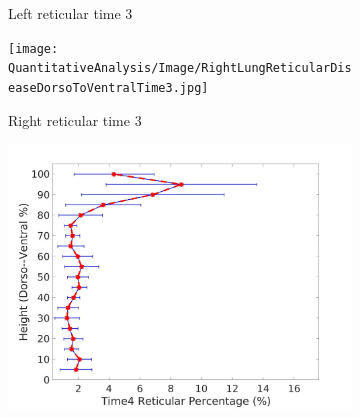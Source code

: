 \begin{figure}[H]
\begin{subfigure}{.41\linewidth}
  \caption{Left reticular time 3}
  \label{fig:DiseaseDorsoToVentralOverTime2-e} 
\end{subfigure} 
\begin{subfigure}{.41\linewidth}%
  \texttt{[image: QuantitativeAnalysis/Image/RightLungReticularDiseaseDorsoToVentralTime3.jpg]}
  \caption{Right reticular time 3}
  \label{fig:DiseaseDorsoToVentralOverTime2-f}
\end{subfigure}
\begin{subfigure}{.41\linewidth}%
  \includegraphics[width=\linewidth,trim={{.0\wd0} {.0\wd0} {.0\wd0} {.0\wd0}},clip]{QuantitativeAnalysis/Image/LeftLungReticularDiseaseDorsoToVentralTime4.jpg} %

\end{subfigure}
\end{figure}
